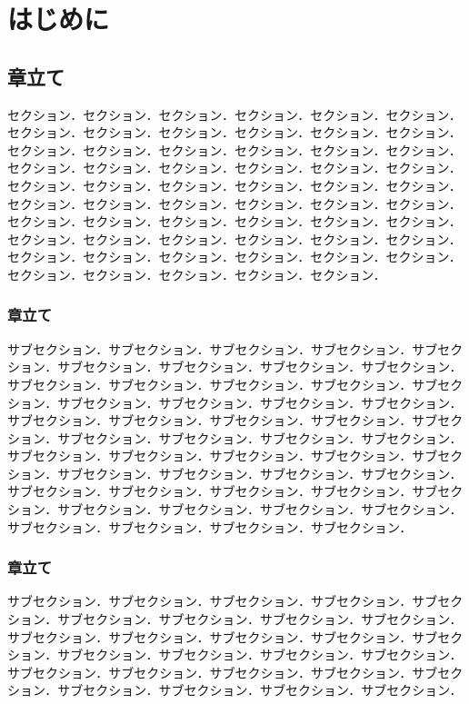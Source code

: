 \documentclass[11pt,a4j]{jreport}
\affiliation{大阪大学 大学院情報科学研究科}{Graduate School of Information Science and Technology, Osaka University}%
\begin{document}
\makepreambles

\chapter{はじめに}\label{chap:intro}

\section{章立て}\label{sec:1}
セクション．\cite{sample1}セクション．セクション．セクション．セクション．セクション．セクション．セクション．セクション．セクション．セクション．セクション．セクション．セクション．セクション．セクション．セクション．セクション．セクション．セクション．セクション．セクション．セクション．セクション．セクション．セクション．セクション．セクション．セクション．セクション．セクション．セクション．セクション．セクション．セクション．セクション．セクション．セクション．セクション．セクション．セクション．セクション．セクション．セクション．セクション．セクション．セクション．セクション．セクション．セクション．セクション．セクション．セクション．セクション．セクション．セクション．セクション．セクション．セクション．

\subsection{章立て}\label{sec:2}
サブセクション．サブセクション．サブセクション．サブセクション．サブセクション．サブセクション．サブセクション．サブセクション．サブセクション．サブセクション．サブセクション．サブセクション．サブセクション．サブセクション．サブセクション．サブセクション．サブセクション．サブセクション．サブセクション．サブセクション．サブセクション．サブセクション．サブセクション．サブセクション．サブセクション．サブセクション．サブセクション．サブセクション．サブセクション．サブセクション．サブセクション．サブセクション．サブセクション．サブセクション．サブセクション．サブセクション．サブセクション．サブセクション．サブセクション．サブセクション．サブセクション．サブセクション．サブセクション．サブセクション．サブセクション．サブセクション．サブセクション．サブセクション．サブセクション．

\subsection{章立て}\label{sec:3}

サブセクション．サブセクション．サブセクション．サブセクション．サブセクション．サブセクション．サブセクション．サブセクション．サブセクション．サブセクション．サブセクション．サブセクション．サブセクション．サブセクション．サブセクション．サブセクション．サブセクション．サブセクション．サブセクション．サブセクション．サブセクション．サブセクション．サブセクション．サブセクション．サブセクション．サブセクション．サブセクション．
\end{document}

